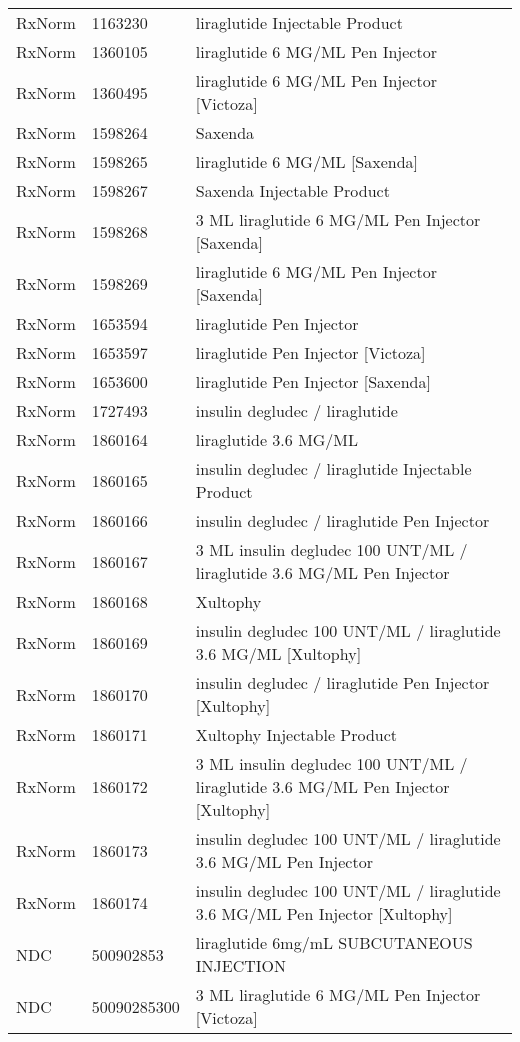\begin{longtable}{p{}p{}p{}}
  RxNorm & 1163230 & liraglutide Injectable Product \\ 
  RxNorm & 1360105 & liraglutide 6 MG/ML Pen Injector \\ 
  RxNorm & 1360495 & liraglutide 6 MG/ML Pen Injector [Victoza] \\ 
  RxNorm & 1598264 & Saxenda \\ 
  RxNorm & 1598265 & liraglutide 6 MG/ML [Saxenda] \\ 
  RxNorm & 1598267 & Saxenda Injectable Product \\ 
  RxNorm & 1598268 & 3 ML liraglutide 6 MG/ML Pen Injector [Saxenda] \\ 
  RxNorm & 1598269 & liraglutide 6 MG/ML Pen Injector [Saxenda] \\ 
  RxNorm & 1653594 & liraglutide Pen Injector \\ 
  RxNorm & 1653597 & liraglutide Pen Injector [Victoza] \\ 
  RxNorm & 1653600 & liraglutide Pen Injector [Saxenda] \\ 
  RxNorm & 1727493 & insulin degludec / liraglutide \\ 
  RxNorm & 1860164 & liraglutide 3.6 MG/ML \\ 
  RxNorm & 1860165 & insulin degludec / liraglutide Injectable Product \\ 
  RxNorm & 1860166 & insulin degludec / liraglutide Pen Injector \\ 
  RxNorm & 1860167 & 3 ML insulin degludec 100 UNT/ML / liraglutide 3.6 MG/ML Pen Injector \\ 
  RxNorm & 1860168 & Xultophy \\ 
  RxNorm & 1860169 & insulin degludec 100 UNT/ML / liraglutide 3.6 MG/ML [Xultophy] \\ 
  RxNorm & 1860170 & insulin degludec / liraglutide Pen Injector [Xultophy] \\ 
  RxNorm & 1860171 & Xultophy Injectable Product \\ 
  RxNorm & 1860172 & 3 ML insulin degludec 100 UNT/ML / liraglutide 3.6 MG/ML Pen Injector [Xultophy] \\ 
  RxNorm & 1860173 & insulin degludec 100 UNT/ML / liraglutide 3.6 MG/ML Pen Injector \\ 
  RxNorm & 1860174 & insulin degludec 100 UNT/ML / liraglutide 3.6 MG/ML Pen Injector [Xultophy] \\ 
  NDC & 500902853 & liraglutide 6mg/mL SUBCUTANEOUS INJECTION \\ 
  NDC & 50090285300 & 3 ML liraglutide 6 MG/ML Pen Injector [Victoza] \\ 

\end{longtable}
